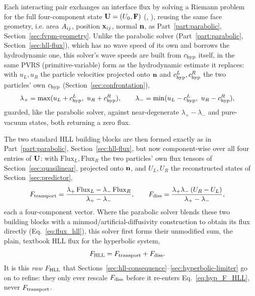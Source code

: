 Each interacting pair exchanges an interface flux by solving a Riemann
problem for the full four-component state $\mathbf{U}=(U_0,\mathbf{F})$
(,
), reusing the same face
geometry, i.e. area $A_{ij}$, position $\mathbf{x}_{ij}$, normal $\mathbf{n}$, as
Part~\ref{part:parabolic}, Section~\ref{sec:fvpm-geometry}. Unlike the
parabolic solver (Part~\ref{part:parabolic}, Section~\ref{sec:hll-flux}),
which has no wave speed of its own and borrows the hydrodynamic one,
this solver's wave speeds are built from $c_{\rm hyp}$ itself, in the same
PVRS (primitive-variable) form as the hydrodynamic estimate it replaces:
with $u_L,u_R$ the particle velocities projected onto $\mathbf{n}$ and
$c_{\rm hyp}^L,c_{\rm hyp}^R$ the two particles' own $c_{\rm hyp}$
(Section~\ref{sec:confrontation}),
\begin{equation}
  \label{eq:hyp_wavespeeds}
  \lambda_+ = \max(u_L+c_{\rm hyp}^L,\ u_R+c_{\rm hyp}^R) , \qquad
  \lambda_- = \min(u_L-c_{\rm hyp}^L,\ u_R-c_{\rm hyp}^R) ,
\end{equation}
guarded, like the parabolic solver, against near-degenerate
$\lambda_+-\lambda_-$ and pure-vacuum states, both returning a zero
flux.

The two standard HLL building blocks are then formed exactly as in
Part~\ref{part:parabolic}, Section~\ref{sec:hll-flux}, but now
component-wise over all four entries of $\mathbf{U}$: with
$\mathrm{Flux}_L,\mathrm{Flux}_R$ the two particles' own flux tensors of
Section~\ref{sec:quasilinear}, projected onto $\mathbf{n}$, and
$U_L,U_R$ the reconstructed states of Section~\ref{sec:predictor},
\begin{equation}
  \label{eq:hyp_F_transport}
  F_{\rm transport} = \frac{\lambda_+\,\mathrm{Flux}_L - \lambda_-\,\mathrm{Flux}_R}{\lambda_+-\lambda_-} ,
  \qquad
  F_{\rm diss} = \frac{\lambda_+\lambda_-\,(U_R-U_L)}{\lambda_+-\lambda_-} ,
\end{equation}
each a four-component vector. Where the parabolic solver blends these
two building blocks with a minmod/artificial-diffusivity construction to
obtain its flux directly (Eq.~\eqref{eq:flux_hll}), this solver first
forms their unmodified sum, the plain, textbook HLL flux for the
hyperbolic system,
\begin{equation}
  \label{eq:hyp_F_HLL}
  F_{\rm HLL} = F_{\rm transport} + F_{\rm diss} .
\end{equation}
It is this \emph{raw} $F_{\rm HLL}$ that
Sections~\ref{sec:hll-consequence}--\ref{sec:hyperbolic-limiter} go on to
refine: they only ever rescale $F_{\rm diss}$ before it re-enters
Eq.~\eqref{eq:hyp_F_HLL}, never $F_{\rm transport}$.

